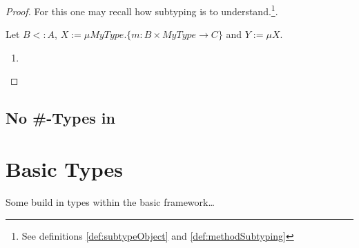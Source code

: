 \begin{proof}
	For this one may recall how subtyping is to understand.\footnote{See
	definitions \ref{def:subtypeObject} and \ref{def:methodSubtyping}}.

	Let $B <: A$, $X := \mu MyType.\{m :
	B \times MyType \rightarrow C \} $ and $Y := \mu X.  $

	\begin{enumerate}

		\item 
	\end{enumerate}
\end{proof}

\begin{mathpar}
\end{mathpar}

\subsection{No \#-Types in \ooplss}
\cite{bruce_foundations_2002}

\section{Basic Types}
Some build in types within the basic framework\ldots

